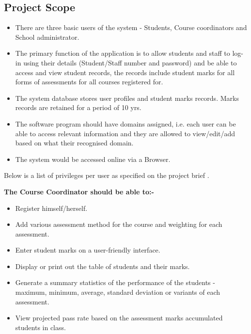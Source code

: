 \documentclass[10pt,onecolumn]{MainDocument}
\begin{document}
\subsection{Project Scope}
\begin{itemize}

\item There are three basic users of the system - Students, Course coordinators and School administrator.
\item The primary function of the application is to allow students and staff  to log-in using their details (Student/Staff number and password) and be able to access and view student records, the records include student marks for all forms of assessments for all courses registered for. 
\item The system database stores user profiles and student marks records. Marks records are retained for a period of 10 yrs.
\item The software program should have domains assigned, i.e. each user can be able to access relevant information and they are allowed to view/edit/add based on what their recognised domain.
\item  The system would be accessed online via a Browser.

\end{itemize}

Below is a list of privileges per user as specified on the project brief \cite{ref9}.

\textbf{The Course Coordinator should be able to:-}
\begin{itemize}
\item Register himself/herself.
\item Add various assessment method for the course and weighting for each assessment.
\item Enter student marks on a user-friendly interface.
\item Display or print out the table of students and their marks.
\item Generate a summary statistics of the performance of the students - maximum, minimum, average, standard deviation or variants of each assessment.  
\item View projected pass rate based on the assessment marks accumulated students in class.
\end{itemize}
\end{document}
